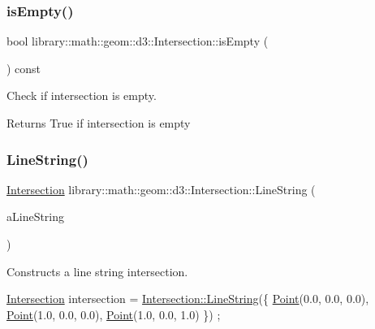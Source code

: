\subsubsection{\texorpdfstring{is\+Empty()}{isEmpty()}}
{\footnotesize\ttfamily bool library\+::math\+::geom\+::d3\+::\+Intersection\+::is\+Empty (\begin{DoxyParamCaption}{ }\end{DoxyParamCaption}) const}



Check if intersection is empty. 

\begin{DoxyReturn}{Returns}
True if intersection is empty 
\end{DoxyReturn}
\mbox{\label{classlibrary_1_1math_1_1geom_1_1d3_1_1_intersection_aa546d0185512a4c093a705a4c96f8960}} 
\subsubsection{\texorpdfstring{Line\+String()}{LineString()}}
{\footnotesize\ttfamily \hyperlink{classlibrary_1_1math_1_1geom_1_1d3_1_1_intersection}{Intersection} library\+::math\+::geom\+::d3\+::\+Intersection\+::\+Line\+String (\begin{DoxyParamCaption}\item[{const \hyperlink{classlibrary_1_1math_1_1geom_1_1d3_1_1objects_1_1_line_string}{objects\+::\+Line\+String} \&}]{a\+Line\+String }\end{DoxyParamCaption})\hspace{0.3cm}{\ttfamily [static]}}



Constructs a line string intersection. 


\begin{DoxyCode}
\hyperlink{classlibrary_1_1math_1_1geom_1_1d3_1_1_intersection_ab800dbab95076a1d7ae47bd9d0887da3}{Intersection} intersection = \hyperlink{classlibrary_1_1math_1_1geom_1_1d3_1_1_intersection_aa546d0185512a4c093a705a4c96f8960}{Intersection::LineString}(\{ 
      \hyperlink{classlibrary_1_1math_1_1geom_1_1d3_1_1_intersection_a5155cc245bd2bf96a4296b0a8319c709}{Point}(0.0, 0.0, 0.0), \hyperlink{classlibrary_1_1math_1_1geom_1_1d3_1_1_intersection_a5155cc245bd2bf96a4296b0a8319c709}{Point}(1.0, 0.0, 0.0), \hyperlink{classlibrary_1_1math_1_1geom_1_1d3_1_1_intersection_a5155cc245bd2bf96a4296b0a8319c709}{Point}(1.0, 0.0, 1.0) \}) ;
\end{DoxyCode}


